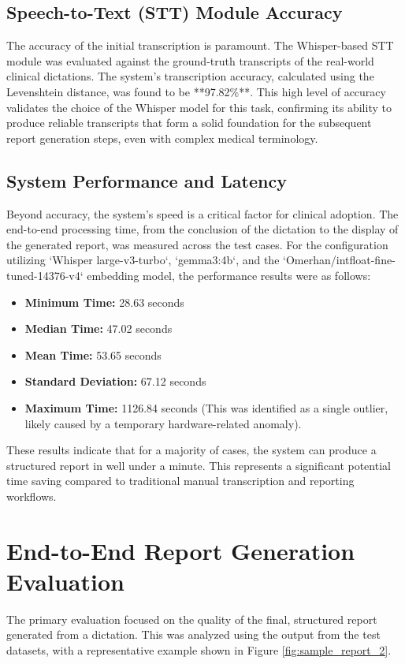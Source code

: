 \subsection{Speech-to-Text (STT) Module Accuracy}
The accuracy of the initial transcription is paramount. The Whisper-based STT module was evaluated against the ground-truth transcripts of the real-world clinical dictations. The system's transcription accuracy, calculated using the Levenshtein distance, was found to be **97.82\%**. This high level of accuracy validates the choice of the Whisper model for this task, confirming its ability to produce reliable transcripts that form a solid foundation for the subsequent report generation steps, even with complex medical terminology.

\subsection{System Performance and Latency}
Beyond accuracy, the system's speed is a critical factor for clinical adoption. The end-to-end processing time, from the conclusion of the dictation to the display of the generated report, was measured across the test cases. For the configuration utilizing `Whisper large-v3-turbo`, `gemma3:4b`, and the `Omerhan/intfloat-fine-tuned-14376-v4` embedding model, the performance results were as follows:
\begin{itemize}
    \item \textbf{Minimum Time:} 28.63 seconds
    \item \textbf{Median Time:} 47.02 seconds
    \item \textbf{Mean Time:} 53.65 seconds
    \item \textbf{Standard Deviation:} 67.12 seconds
    \item \textbf{Maximum Time:} 1126.84 seconds (This was identified as a single outlier, likely caused by a temporary hardware-related anomaly).
\end{itemize}
These results indicate that for a majority of cases, the system can produce a structured report in well under a minute. This represents a significant potential time saving compared to traditional manual transcription and reporting workflows.

\section{End-to-End Report Generation Evaluation}

The primary evaluation focused on the quality of the final, structured report generated from a dictation. This was analyzed using the output from the test datasets, with a representative example shown in Figure \ref{fig:sample_report_2}.

